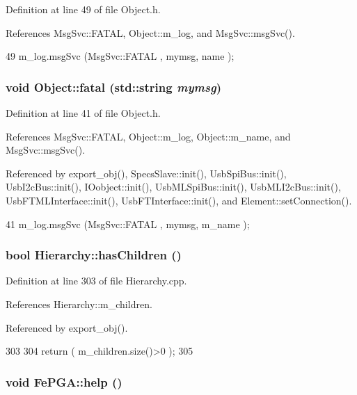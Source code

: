 Definition at line 49 of file Object.h.

References MsgSvc::FATAL, Object::m\_\-log, and MsgSvc::msgSvc().


\begin{DoxyCode}
49 { m_log.msgSvc (MsgSvc::FATAL   , mymsg, name ); }
\end{DoxyCode}
\hypertarget{classObject_aad5a16aac7516ce65bd5ec02ab07fc80}{
\subsubsection[{fatal}]{\setlength{\rightskip}{0pt plus 5cm}void Object::fatal (std::string {\em mymsg})}}
\label{classObject_aad5a16aac7516ce65bd5ec02ab07fc80}


Definition at line 41 of file Object.h.

References MsgSvc::FATAL, Object::m\_\-log, Object::m\_\-name, and MsgSvc::msgSvc().

Referenced by export\_\-obj(), SpecsSlave::init(), UsbSpiBus::init(), UsbI2cBus::init(), IOobject::init(), UsbMLSpiBus::init(), UsbMLI2cBus::init(), UsbFTMLInterface::init(), UsbFTInterface::init(), and Element::setConnection().


\begin{DoxyCode}
41 { m_log.msgSvc (MsgSvc::FATAL   , mymsg, m_name ); }
\end{DoxyCode}
\hypertarget{classHierarchy_a255174fe4d316d2a3f430dcb9dab29f1}{
\subsubsection[{hasChildren}]{\setlength{\rightskip}{0pt plus 5cm}bool Hierarchy::hasChildren ()}}
\label{classHierarchy_a255174fe4d316d2a3f430dcb9dab29f1}


Definition at line 303 of file Hierarchy.cpp.

References Hierarchy::m\_\-children.

Referenced by export\_\-obj().


\begin{DoxyCode}
303                               {
304   return ( m_children.size()>0 );
305 }
\end{DoxyCode}
\hypertarget{classFePGA_ae6425fbad1a8db57025efaf387a6f41b}{
\subsubsection[{help}]{\setlength{\rightskip}{0pt plus 5cm}void FePGA::help ()}}
\label{classFePGA_ae6425fbad1a8db57025efaf387a6f41b}


